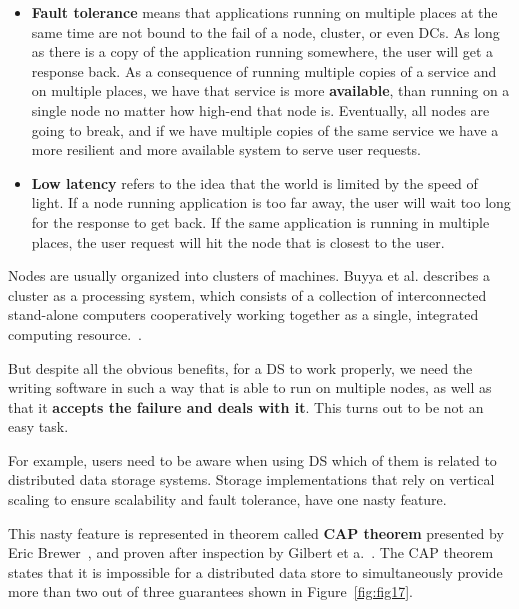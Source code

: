 \begin{itemize}
	\item \textbf{Fault tolerance} means that applications running on multiple places at the same time are not bound to the fail of a node, cluster, or even DCs. As long as there is a copy of the application running somewhere, the user will get a response back. As a consequence of running multiple copies of a service and on multiple places, we have that service is more \textbf{available}, than running on a single node no matter how high-end that node is. Eventually, all nodes are going to break, and if we have multiple copies of the same service we have a more resilient and more available system to serve user requests.
	\item \textbf{Low latency} refers to the idea that the world is limited by the speed of light. If a node running application is too far away, the user will wait too long for the response to get back. If the same application is running in multiple places, the user request will hit the node that is closest to the user.
\end{itemize}

\noindent
Nodes are usually organized into clusters of machines. Buyya et al. describes a cluster as a processing system, which consists of a collection of interconnected stand-alone computers cooperatively working together as a single, integrated computing resource.~\cite{Buyya}.

But despite all the obvious benefits, for a DS to work properly, we need the writing software in such a way that is able to run on multiple nodes, as well as that it \textbf{accepts the failure and deals with it}. This turns out to be not an easy task.

For example, users need to be aware when using DS which of them is related to distributed data storage systems. Storage implementations that rely on vertical scaling to ensure scalability and fault tolerance, have one nasty feature. 

This nasty feature is represented in theorem called \textbf{CAP theorem} presented by Eric Brewer~\cite{Brewer2000}, and proven after inspection by Gilbert et a.~\cite{GilbertL02}. The CAP theorem states that it is impossible for a distributed data store to simultaneously provide more than two out of three guarantees shown in Figure~\ref{fig:fig17}.

